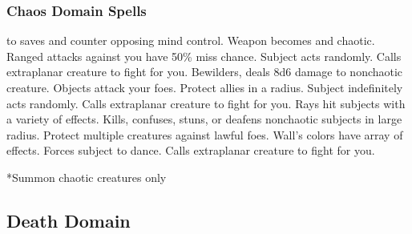 \subsubsection{Chaos Domain Spells}
\begin{spelllist}
  \spellhead[1]{}
    to saves and counter opposing mind control.
   Weapon becomes  and chaotic.
   Ranged attacks against you have 50\% miss chance.
   Subject acts randomly.
   Calls extraplanar creature to fight for you.
   Bewilders, deals 8d6 damage to nonchaotic creature.
   Objects attack your foes.
   Protect allies in a \areamed radius.
   Subject indefinitely acts randomly.
   Calls extraplanar creature to fight for you.
   Rays hit subjects with a variety of effects.
   Kills, confuses, stuns, or deafens nonchaotic subjects in large radius.
  \F Protect multiple creatures against lawful foes. 
   Wall's colors have array of effects.
   Forces subject to dance.
   Calls extraplanar creature to fight for you.
\end{spelllist}
*Summon chaotic creatures only

\subsection{Death Domain}
